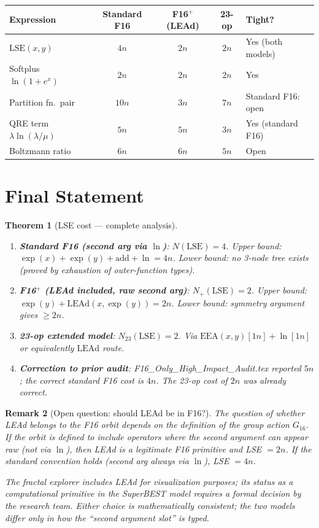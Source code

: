 \documentclass[11pt]{article}
\newtheorem{theorem}{Theorem}
\newtheorem{remark}[theorem]{Remark}
\begin{document}
\begin{center}
\renewcommand{\arraystretch}{1.3}
\begin{tabular}{lcccl}
\toprule
Expression & Standard F16 & F16$^+$ (LEAd) & 23-op & Tight? \\
\midrule
$\mathrm{LSE}(x,y)$ & $4n$ & $2n$ & $2n$ & Yes (both models) \\
Softplus $\ln(1+e^x)$ & $2n$ & $2n$ & $2n$ & Yes \\
Partition fn.\ pair & $10n$ & $3n$ & $7n$ & Standard F16: open \\
QRE term $\lambda \ln(\lambda/\mu)$ & $5n$ & $5n$ & $3n$ & Yes (standard F16) \\
Boltzmann ratio & $6n$ & $6n$ & $5n$ & Open \\
\bottomrule
\end{tabular}
\end{center}

\section{Final Statement}

\begin{theorem}[LSE cost — complete analysis]
\label{thm:final}
\begin{enumerate}
  \item \textbf{Standard F16 (second arg via $\ln$)}: $N(\mathrm{LSE}) = 4$.
    Upper bound: $\exp(x) + \exp(y) + \mathrm{add} + \ln = 4n$.
    Lower bound: no 3-node tree exists (proved by exhaustion of outer-function types).

  \item \textbf{F16$^+$ (LEAd included, raw second arg)}: $N_+(\mathrm{LSE}) = 2$.
    Upper bound: $\exp(y) + \mathrm{LEAd}(x, \exp(y)) = 2n$.
    Lower bound: symmetry argument gives $\geq 2n$.

  \item \textbf{23-op extended model}: $N_{23}(\mathrm{LSE}) = 2$.
    Via $\mathrm{EEA}(x,y)[1n] + \ln[1n]$ or equivalently $\mathrm{LEAd}$ route.

  \item \textbf{Correction to prior audit}: F16\_Only\_High\_Impact\_Audit.tex
    reported $5n$; the correct standard F16 cost is $4n$.
    The 23-op cost of $2n$ was already correct.
\end{enumerate}
\end{theorem}

\begin{remark}[Open question: should LEAd be in F16?]
The question of whether LEAd belongs to the F16 orbit depends on the definition
of the group action $G_{16}$. If the orbit is defined to include operators where
the second argument can appear raw (not via $\ln$), then LEAd is a legitimate
F16 primitive and LSE $= 2n$. If the standard convention holds (second arg always
via $\ln$), LSE $= 4n$.

The fractal explorer includes LEAd for visualization purposes; its status
as a computational primitive in the SuperBEST model requires a formal decision
by the research team. Either choice is mathematically consistent; the two models
differ only in how the ``second argument slot'' is typed.
\end{remark}
\end{document}
